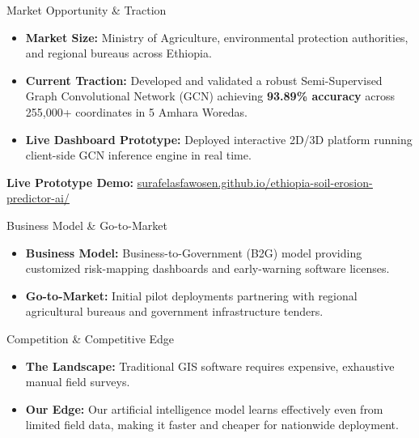 \documentclass[aspectratio=43]{beamer}
\begin{document}
\begin{frame}{Market Opportunity \& Traction}
    \vspace{0.4cm}
    \begin{itemize}
        \setlength\itemsep{1.1em}
        \item \textbf{Market Size:} Ministry of Agriculture, environmental protection authorities, and regional bureaus across Ethiopia.
        \item \textbf{Current Traction:} Developed and validated a robust Semi-Supervised Graph Convolutional Network (GCN) achieving \textbf{93.89\% accuracy} across 255,000+ coordinates in 5 Amhara Woredas.
        \item \textbf{Live Dashboard Prototype:} Deployed interactive 2D/3D platform running client-side GCN inference engine in real time.
    \end{itemize}
    \vspace{0.4cm}
    \centering
    \footnotesize
    \textbf{Live Prototype Demo:} \href{https://surafelasfawosen.github.io/ethiopia-soil-erosion-predictor-ai/}{\color{blue}\underline{surafelasfawosen.github.io/ethiopia-soil-erosion-predictor-ai/}}
\end{frame}

\begin{frame}{Business Model \& Go-to-Market}
    \vspace{0.6cm}
    \begin{itemize}
        \setlength\itemsep{1.5em}
        \item \textbf{Business Model:} Business-to-Government (B2G) model providing customized risk-mapping dashboards and early-warning software licenses.
        \item \textbf{Go-to-Market:} Initial pilot deployments partnering with regional agricultural bureaus and government infrastructure tenders.
    \end{itemize}
\end{frame}

\begin{frame}{Competition \& Competitive Edge}
    \vspace{0.6cm}
    \begin{itemize}
        \setlength\itemsep{1.5em}
        \item \textbf{The Landscape:} Traditional GIS software requires expensive, exhaustive manual field surveys.
        \item \textbf{Our Edge:} Our artificial intelligence model learns effectively even from limited field data, making it faster and cheaper for nationwide deployment.
    \end{itemize}
\end{frame}
\end{document}
